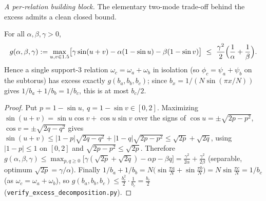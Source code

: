 \emph{A per-relation building block.} The elementary two-mode trade-off behind the excess admits a clean
closed bound.
\begin{lemma}\label{lem:triplet}
For all $\alpha,\beta,\gamma>0$,
\[
  g(\alpha,\beta,\gamma):=\max_{u,v\in\R}\bigl[\gamma\sin(u+v)-\alpha(1-\sin u)-\beta(1-\sin v)\bigr]
  \ \le\ \frac{\gamma^2}{2}\Bigl(\frac1\alpha+\frac1\beta\Bigr).
\]
Hence a single support-$3$ relation $\omega_c=\omega_a+\omega_b$ in isolation (so $\phi_c=\psi_a+\psi_b$ on
the subtorus) has excess exactly $g(b_a,b_b,b_c)$; since $b_x=1/(N\sin(\pi x/N))$ gives $1/b_a+1/b_b=1/b_c$,
this is at most $b_c/2$.
\end{lemma}
\begin{proof}
Put $p=1-\sin u,\ q=1-\sin v\in[0,2]$. Maximizing $\sin(u+v)=\sin u\cos v+\cos u\sin v$ over the signs of
$\cos u=\pm\sqrt{2p-p^2}$, $\cos v=\pm\sqrt{2q-q^2}$ gives
$\sin(u+v)\le|1-p|\sqrt{2q-q^2}+|1-q|\sqrt{2p-p^2}\le\sqrt{2p}+\sqrt{2q}$, using $|1-p|\le1$ on $[0,2]$ and
$\sqrt{2p-p^2}\le\sqrt{2p}$. Therefore
$g(\alpha,\beta,\gamma)\le\max_{p,q\ge0}\bigl[\gamma(\sqrt{2p}+\sqrt{2q})-\alpha p-\beta q\bigr]
=\frac{\gamma^2}{2\alpha}+\frac{\gamma^2}{2\beta}$ (separable, optimum $\sqrt{2p}=\gamma/\alpha$). Finally
$1/b_a+1/b_b=N\bigl(\sin\tfrac{\pi a}N+\sin\tfrac{\pi b}N\bigr)=N\sin\tfrac{\pi c}N=1/b_c$ (as
$\omega_c=\omega_a+\omega_b$), so $g(b_a,b_b,b_c)\le\tfrac{b_c^2}2\cdot\tfrac1{b_c}=\tfrac{b_c}2$
(\texttt{verify\_excess\_decomposition.py}).
\end{proof}

